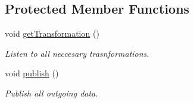 \subsection*{Protected Member Functions}
\begin{DoxyCompactItemize}
\item 
void \hyperlink{classController_a5f86e07f526598b251e345a908923950}{get\+Transformation} ()\hypertarget{classController_a5f86e07f526598b251e345a908923950}{}\label{classController_a5f86e07f526598b251e345a908923950}

\begin{DoxyCompactList}\small\item\em Listen to all neccesary trasnformations. \end{DoxyCompactList}\item 
void \hyperlink{classController_ae6859e3a43be2fa31cb82ace3954e746}{publish} ()\hypertarget{classController_ae6859e3a43be2fa31cb82ace3954e746}{}\label{classController_ae6859e3a43be2fa31cb82ace3954e746}

\begin{DoxyCompactList}\small\item\em Publish all outgoing data. \end{DoxyCompactList}\end{DoxyCompactItemize}
